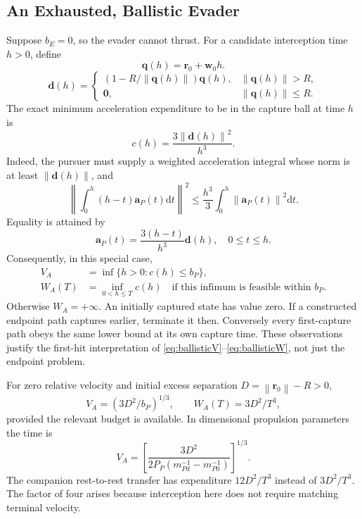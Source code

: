 \documentclass[journal,a4paper]{IEEEtran}
\newcommand{\norm}[1]{\left\|#1\right\|}
\newcommand{\dd}{\mathrm d}
\begin{document}
\subsection{An Exhausted, Ballistic Evader}
Suppose $b_E=0$, so the evader cannot thrust. For a candidate interception time $h>0$, define
\begin{equation}
 \mathbf q(h)=\mathbf r_0+\mathbf w_0h.
\end{equation}
\begin{equation}
 \mathbf d(h)=
 \begin{cases}
 (1-R/\norm{\mathbf q(h)})\mathbf q(h),&\norm{\mathbf q(h)}>R,\\
 \mathbf0,&\norm{\mathbf q(h)}\le R.
 \end{cases}
\end{equation}
The exact minimum acceleration expenditure to be in the capture ball at time $h$ is
\begin{equation}
 \boxed{c(h)=\frac{3\norm{\mathbf d(h)}^2}{h^3}.}
 \label{eq:ballisticcost}
\end{equation}
Indeed, the pursuer must supply a weighted acceleration integral whose norm is at least $\norm{\mathbf d(h)}$, and
\begin{equation}
 \norm{\int_0^h(h-t)\mathbf a_P(t)\dd t}^2
 \le\frac{h^3}{3}\int_0^h\norm{\mathbf a_P(t)}^2\dd t.
\end{equation}
Equality is attained by
\begin{equation}
 \boxed{\mathbf a_P(t)=\frac{3(h-t)}{h^3}\mathbf d(h),
                     \quad 0\le t\le h.}
 \label{eq:ballisticcontrol}
\end{equation}
Consequently, in this special case,
\begin{align}
 V_A&=\inf\{h>0:c(h)\le b_P\},\label{eq:ballisticV}\\
 W_A(T)&=\inf_{0<h\le T}c(h)
 \quad\text{if this infimum is feasible within }b_P.\label{eq:ballisticW}
\end{align}
Otherwise $W_A=+\infty$. An initially captured state has value zero. If a constructed endpoint path captures earlier, terminate it then. Conversely every first-capture path obeys the same lower bound at its own capture time. These observations justify the first-hit interpretation of \eqref{eq:ballisticV}--\eqref{eq:ballisticW}, not just the endpoint problem.

For zero relative velocity and initial excess separation $D=\norm{\mathbf r_0}-R>0$,
\begin{equation}
 \boxed{V_A=(3D^2/b_P)^{1/3},\qquad
 W_A(T)=3D^2/T^3,}
 \label{eq:restintercept}
\end{equation}
provided the relevant budget is available. In dimensional propulsion parameters the time is
\begin{equation}
 V_A=\left[\frac{3D^2}{2P_P(m_{Pd}^{-1}-m_{P0}^{-1})}\right]^{1/3}.
\end{equation}
The companion rest-to-rest transfer has expenditure $12D^2/T^3$ instead of $3D^2/T^3$. The factor of four arises because interception here does not require matching terminal velocity.
\end{document}
